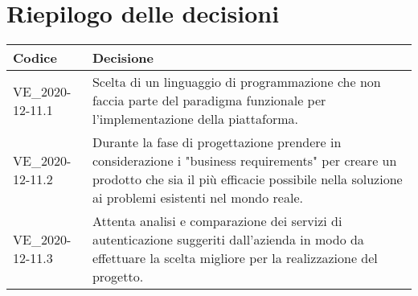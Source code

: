 \section{Riepilogo delle decisioni}
\setcounter{table}{-1}
{
\centering
\renewcommand{\arraystretch}{1.5}
\begin{longtable}{>{\centering}p{} >{}p{}}
\rowcolor{azzurro1}
\textbf{Codice} &
\centerline{\textbf{Decisione}}\\
\endhead

VE{\_}2020-12-11.1 & Scelta di un linguaggio di programmazione che non faccia parte del paradigma funzionale per l'implementazione della piattaforma.\\
VE{\_}2020-12-11.2 & Durante la fase di progettazione prendere in considerazione i "business requirements" per creare un prodotto che sia il più efficacie possibile nella soluzione ai problemi esistenti nel mondo reale.\\
VE{\_}2020-12-11.3 & Attenta analisi e comparazione dei servizi di autenticazione suggeriti dall'azienda in modo da effettuare la scelta migliore per la realizzazione del progetto.\\
\end{longtable}
}